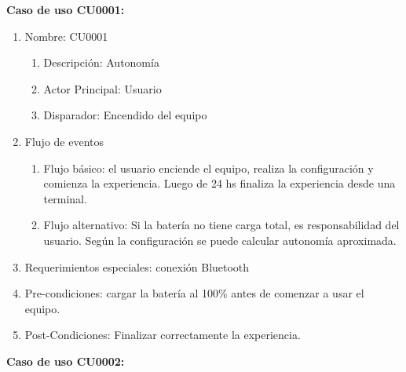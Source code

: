 	\textbf{Caso de uso CU0001:}

	\begin{enumerate} 
		\item Nombre: CU0001
		\begin{enumerate} [label*=\arabic*.]
			\item Descripción: Autonomía
			\item Actor Principal: Usuario
			\item Disparador: Encendido del equipo		
		\end{enumerate}
		\item Flujo de eventos
		\begin{enumerate} [label*=\arabic*.]
			\item Flujo básico: el usuario enciende el equipo, realiza la configuración y comienza la experiencia. Luego de 24 hs finaliza la experiencia desde una terminal.
			\item Flujo alternativo: Si la batería no tiene carga total, es responsabilidad del usuario. Según la configuración se puede calcular autonomía aproximada.
		\end{enumerate}

		\item Requerimientos especiales: conexión Bluetooth
		\item Pre-condiciones: cargar la batería al 100\% antes de comenzar a usar el equipo.
		\item Post-Condiciones: Finalizar correctamente la experiencia.				
	\end{enumerate}

	\textbf{Caso de uso CU0002:}


